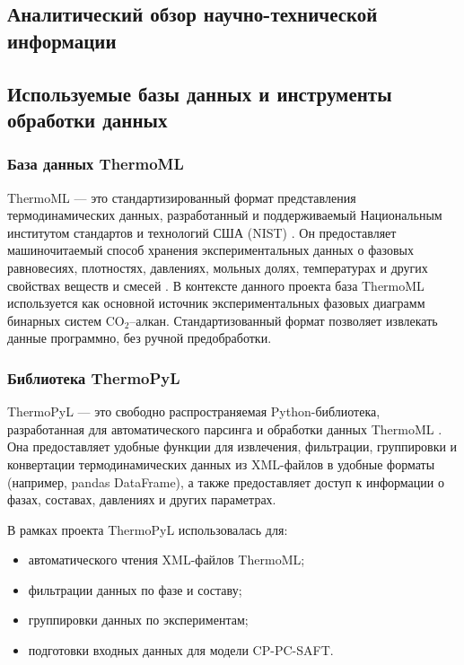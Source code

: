 \documentclass[a4paper,12pt]{article}
\begin{document}
\subsection{Аналитический обзор научно-технической информации}

\subsection{Используемые базы данных и инструменты обработки данных}

\subsubsection{База данных ThermoML}

ThermoML — это стандартизированный формат представления термодинамических данных, разработанный и поддерживаемый Национальным институтом стандартов и технологий США (NIST) \cite{Frenkel2004}. Он предоставляет машиночитаемый способ хранения экспериментальных данных о фазовых равновесиях, плотностях, давлениях, мольных долях, температурах и других свойствах веществ и смесей \cite{Chirico2020}. В контексте данного проекта база ThermoML используется как основной источник экспериментальных фазовых диаграмм бинарных систем $\mathrm{CO}_2$–алкан. Стандартизованный формат позволяет извлекать данные программно, без ручной предобработки.

\subsubsection{Библиотека ThermoPyL}

ThermoPyL — это свободно распространяемая Python-библиотека, разработанная для автоматического парсинга и обработки данных ThermoML \cite{Picard2015}. Она предоставляет удобные функции для извлечения, фильтрации, группировки и конвертации термодинамических данных из XML-файлов в удобные форматы (например, pandas DataFrame), а также предоставляет доступ к информации о фазах, составах, давлениях и других параметрах.

В рамках проекта ThermoPyL использовалась для:
\begin{itemize}
\item автоматического чтения XML-файлов ThermoML;
\item фильтрации данных по фазе и составу;
\item группировки данных по экспериментам;
\item подготовки входных данных для модели CP-PC-SAFT.
\end{itemize}
\end{document}
